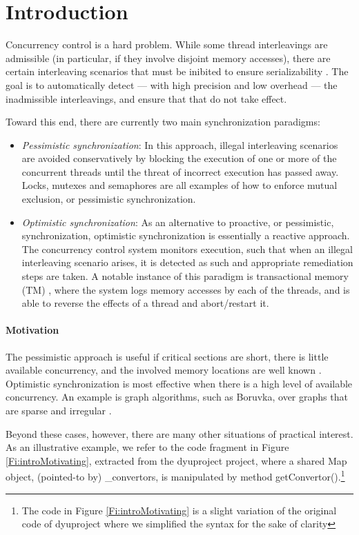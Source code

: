 \section{Introduction}

Concurrency control is a hard problem. While some thread interleavings are admissible (in particular, if they involve disjoint memory accesses), there are certain interleaving scenarios that must be inibited to ensure serializability \cite{Serializability}. The goal is to automatically detect --- with high precision and low overhead --- the inadmissible interleavings, and ensure that that do not take effect.  

Toward this end, there are currently two main synchronization paradigms:
\begin{itemize}
	\item \textit{Pessimistic synchronization}: In this approach, illegal interleaving scenarios are avoided conservatively by blocking the execution of one or more of the concurrent threads until the threat of incorrect execution has passed away. Locks, mutexes and semaphores are all examples of how to enforce mutual exclusion, or pessimistic synchronization.
	\item \textit{Optimistic synchronization}: As an alternative to proactive, or pessimistic, synchronization, optimistic synchronization is essentially a reactive approach. The concurrency control system monitors execution, such that when an illegal interleaving scenario arises, it is detected as such and appropriate remediation steps are taken. A notable instance of this paradigm is transactional memory (TM) \cite{DBLP:conf/isca/HerlihyM93}, where the system logs memory accesses by each of the threads, and is able to reverse the effects of a thread and abort/restart it.
\end{itemize}

\paragraph{Motivation} The pessimistic approach is useful if critical sections are short, there is little available concurrency, and the involved memory locations are well known \cite{AndiKleen}. Optimistic synchronization is most effective when there is a high level of available concurrency. An example is graph algorithms, such as Boruvka, over graphs that are sparse and irregular \cite{KulkarniGalois}.

Beyond these cases, however, there are many other situations of practical interest. As an illustrative example, we refer to the code fragment in Figure \ref{Fi:introMotivating}, extracted from the {\sf dyuproject} project, where a shared {\sf Map} object, (pointed-to by) {\sf \_convertors}, is manipulated by method {\sf getConvertor()}.\footnote{The code in Figure \ref{Fi:introMotivating} is a slight variation of the original code of {\sf dyuproject} where we simplified the syntax for the sake of clarity}

